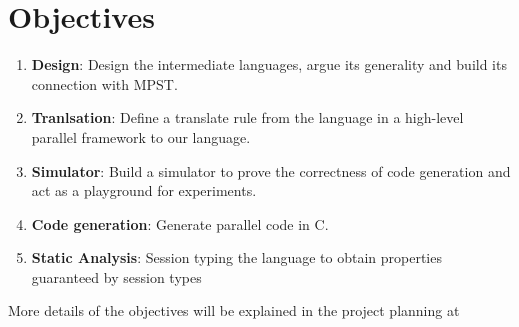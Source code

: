 \section{Objectives}
\begin{enumerate}
\item \textbf{Design}: Design the intermediate languages, argue its generality and build its connection with MPST. 
\item \textbf{Tranlsation}: Define a translate rule from the language in a high-level parallel framework to our language. 
\item \textbf{Simulator}: Build a simulator to prove the correctness of code generation and act as a playground for experiments.
\item \textbf{Code generation}: Generate parallel code in C.
\item \textbf{Static Analysis}: Session typing the language to obtain properties guaranteed by session types%
\end{enumerate}
More details of the objectives will be explained in the project planning at 